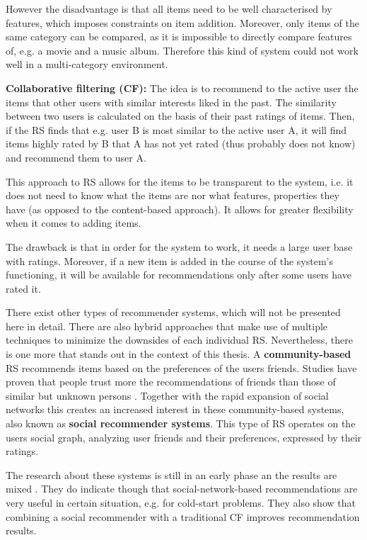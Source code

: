 \documentclass[12pt]{report}
\begin{document}
However the disadvantage is that all items need to be well characterised by features, which imposes constraints on item addition. Moreover, only items of the same category can be compared, as it is impossible to directly compare features of, e.g. a movie and a music album. Therefore this kind of system could not work well in a multi-category environment.

\hbox{}
{\bf Collaborative filtering (CF):} The idea is to recommend to the active user the items that other users with similar interests liked in the past. The similarity between two users is calculated on the basis of their past ratings of items. Then, if the RS finds that e.g. user B is most similar to the active user A, it will find items highly rated by B that A has not yet rated (thus probably does not know) and recommend them to user A.

This approach to RS allows for the items to be transparent to the system, i.e. it does not need to know what the items are nor what features, properties they have (as opposed to the content-based approach). It allows for greater flexibility when it comes to adding items.

The drawback is that in order for the system to work, it needs a large user base with ratings. Moreover, if a new item is added in the course of the system's functioning, it will be available for recommendations only after some users have rated it.

\hbox{}
There exist other types of recommender systems, which will not be presented here in detail. There are also hybrid approaches that make use of multiple techniques to minimize the downsides of each individual RS. 
Nevertheless, there is one more that stands out in the context of this thesis. A {\bf community-based} RS recommends items based on the preferences of the users friends. Studies have proven that people trust more the recommendations of friends than those of similar but unknown persons \cite{sinha}. Together with the rapid expansion of social networks this creates an increased interest in these community-based systems, also known as {\bf social recommender systems}. This type of RS operates on the users social graph, analyzing user friends and their preferences, expressed by their ratings.

The research about these systems is still in an early phase an the results are mixed \cite{rec_sys_handbook}. They do indicate though that social-network-based recommendations are very useful in certain situation, e.g. for cold-start problems. They also show that combining a social recommender with a traditional CF improves recommendation results.
\end{document}
